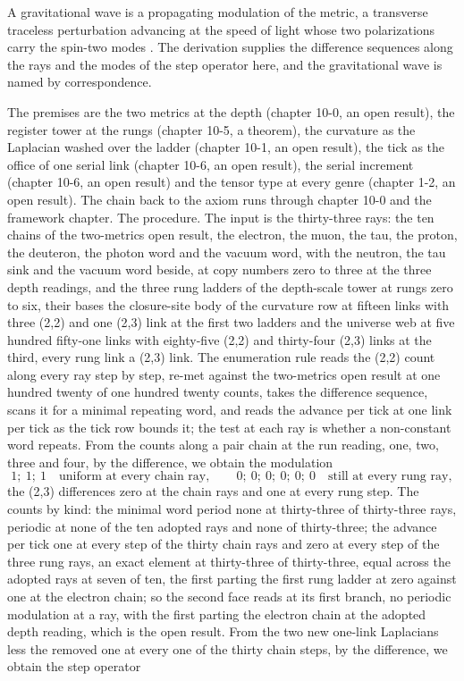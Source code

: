 \begin{chbridge}
A gravitational wave is a propagating modulation of the metric, a transverse traceless perturbation advancing at the speed of light whose two polarizations carry the spin-two modes \cite{Einstein1918,Weinberg1965}. The derivation supplies the difference sequences along the rays and the modes of the step operator here, and the gravitational wave is named by correspondence.
\end{chbridge}
\begin{chproof}
The premises are the two metrics at the depth (chapter 10-0, an open result), the register tower at the rungs (chapter 10-5, a theorem), the curvature as the Laplacian washed over the ladder (chapter 10-1, an open result), the tick as the office of one serial link (chapter 10-6, an open result), the serial increment (chapter 10-6, an open result) and the tensor type at every genre (chapter 1-2, an open result). The chain back to the axiom runs through chapter 10-0 and the framework chapter. The procedure. The input is the thirty-three rays: the ten chains of the two-metrics open result, the electron, the muon, the tau, the proton, the deuteron, the photon word and the vacuum word, with the neutron, the tau sink and the vacuum word beside, at copy numbers zero to three at the three depth readings, and the three rung ladders of the depth-scale tower at rungs zero to six, their bases the closure-site body of the curvature row at fifteen links with three (2,2) and one (2,3) link at the first two ladders and the universe web at five hundred fifty-one links with eighty-five (2,2) and thirty-four (2,3) links at the third, every rung link a (2,3) link. The enumeration rule reads the (2,2) count along every ray step by step, re-met against the two-metrics open result at one hundred twenty of one hundred twenty counts, takes the difference sequence, scans it for a minimal repeating word, and reads the advance per tick at one link per tick as the tick row bounds it; the test at each ray is whether a non-constant word repeats. From the counts along a pair chain at the run reading, one, two, three and four, by the difference, we obtain the modulation
\begin{equation}
1;\ 1;\ 1 \quad\text{uniform at every chain ray} , \qquad 0;\ 0;\ 0;\ 0;\ 0;\ 0 \quad\text{still at every rung ray} ,
\end{equation}
the (2,3) differences zero at the chain rays and one at every rung step. The counts by kind: the minimal word period none at thirty-three of thirty-three rays, periodic at none of the ten adopted rays and none of thirty-three; the advance per tick one at every step of the thirty chain rays and zero at every step of the three rung rays, an exact element at thirty-three of thirty-three, equal across the adopted rays at seven of ten, the first parting the first rung ladder at zero against one at the electron chain; so the second face reads at its first branch, no periodic modulation at a ray, with the first parting the electron chain at the adopted depth reading, which is the open result. From the two new one-link Laplacians less the removed one at every one of the thirty chain steps, by the difference, we obtain the step operator

\end{chproof}
